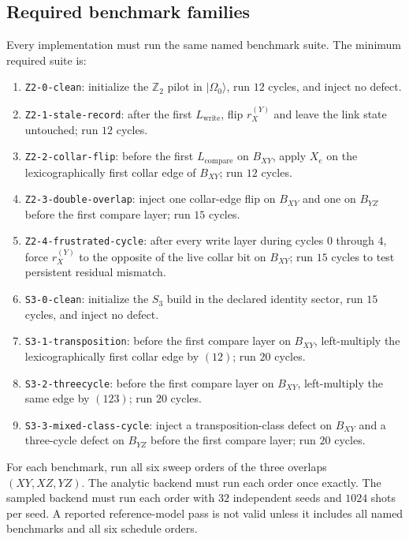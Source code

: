 \documentclass[11pt]{article}
\begin{document}
\subsection{Required benchmark families}

Every implementation must run the same named benchmark suite. The minimum required suite is:
\begin{enumerate}[leftmargin=2em]
\item \texttt{Z2-0-clean}: initialize the $\mathbb Z_2$ pilot in $|\Omega_0\rangle$, run $12$
cycles, and inject no defect.
\item \texttt{Z2-1-stale-record}: after the first $L_{\mathrm{write}}$, flip $r_X^{(Y)}$ and
leave the link state untouched; run $12$ cycles.
\item \texttt{Z2-2-collar-flip}: before the first $L_{\mathrm{compare}}$ on $B_{XY}$, apply
$X_e$ on the lexicographically first collar edge of $B_{XY}$; run $12$ cycles.
\item \texttt{Z2-3-double-overlap}: inject one collar-edge flip on $B_{XY}$ and one on $B_{YZ}$
before the first compare layer; run $15$ cycles.
\item \texttt{Z2-4-frustrated-cycle}: after every write layer during cycles $0$ through $4$,
force $r_X^{(Y)}$ to the opposite of the live collar bit on $B_{XY}$; run $15$ cycles to test
persistent residual mismatch.
\item \texttt{S3-0-clean}: initialize the $S_3$ build in the declared identity sector, run $15$
cycles, and inject no defect.
\item \texttt{S3-1-transposition}: before the first compare layer on $B_{XY}$, left-multiply the
lexicographically first collar edge by $(12)$; run $20$ cycles.
\item \texttt{S3-2-threecycle}: before the first compare layer on $B_{XY}$, left-multiply the
same edge by $(123)$; run $20$ cycles.
\item \texttt{S3-3-mixed-class-cycle}: inject a transposition-class defect on $B_{XY}$ and a
three-cycle defect on $B_{YZ}$ before the first compare layer; run $20$ cycles.
\end{enumerate}

For each benchmark, run all six sweep orders of the three overlaps $(XY,XZ,YZ)$. The analytic
backend must run each order once exactly. The sampled backend must run each order with $32$
independent seeds and $1024$ shots per seed. A reported reference-model pass is not valid unless it
includes all named benchmarks and all six schedule orders.
\end{document}
